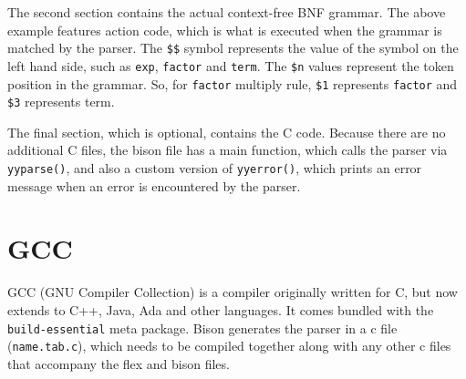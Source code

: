 \documentclass[12pt]{report}
\begin{document}
The second section contains the actual context-free BNF grammar.  The above example features action code, which is what is executed when the grammar is matched by the parser.  The \texttt{\$\$} symbol represents the value of the symbol on the left hand side, such as \texttt{exp}, \texttt{factor} and \texttt{term}.  The \texttt{\$n} values represent the token position in the grammar.  So, for \texttt{factor} multiply rule, \texttt{\$1} represents \texttt{factor} and \texttt{\$3} represents term.

The final section, which is optional, contains the C code.  Because there are no additional C files, the bison file has a main function, which calls the parser via \texttt{yyparse()}, and also a custom version of \texttt{yyerror()}, which prints an error message when an error is encountered by the parser.
\section{GCC}\label{fig:gcc}
GCC (GNU Compiler Collection) is a compiler originally written for C, but now extends to C++, Java, Ada and other languages.  It comes bundled with the \texttt{build-essential} meta package.  Bison generates the parser in a c file (\texttt{name.tab.c}), which needs to be compiled together along with any other c files that accompany the flex and bison files.
\end{document}
